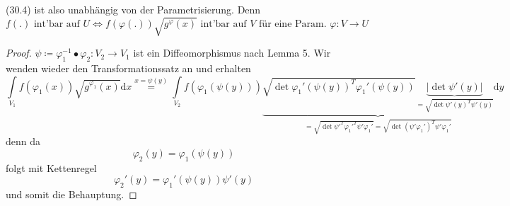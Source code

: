 (30.4) ist also unabhängig von der Parametrisierung. Denn
\begin{equation}
    f(.) \text{ int'bar auf } U
    \Longleftrightarrow f(\varphi(.)) \sqrt{g^\varphi (x)} 
    \text{ int'bar auf } V
    \text{ für eine Param. }
    \varphi: V \rightarrow U
\end{equation}

\begin{proof}
    $\psi \coloneqq \varphi_1^{-1} \bullet \varphi_2: V_2 \rightarrow V_1 $
    ist ein Diffeomorphismus nach Lemma 5. Wir wenden wieder den Transformationssatz an und erhalten
	\begin{equation*}
		\int\limits_{V_1} f(\varphi_1(x)) \sqrt{g^{\varphi_1} (x)} \mathrm{d}x
    	\stackrel{x=\psi(y)}{=}
   	 	\int\limits_{V_2} f(\varphi_1(\psi(y)))
    	\underbrace{
        \sqrt{\det \varphi_1'(\psi(y))^T \varphi_1'(\psi(y))}
        \underbrace{
            |\det \psi'(y)|
            }_{
            = \sqrt{\det \psi'(y)^T \psi'(y)}}
        }_{
        = \sqrt{\det \psi'^T \varphi_1'^T \psi' \varphi_1'}
        = \sqrt{\det (\psi' \varphi_1')^T \psi' \varphi_1'}
        }
    	\mathrm{d}y
	\end{equation*}	    
    denn da
    \begin{equation*}
		\varphi_2 (y) = \varphi_1 (\psi(y))
	\end{equation*}	   
	folgt mit Kettenregel
	 \begin{equation*}
    	\varphi_2' (y) = \varphi_1' (\psi(y)) \psi'(y)
	\end{equation*}	 
	und somit die Behauptung.
\end{proof}